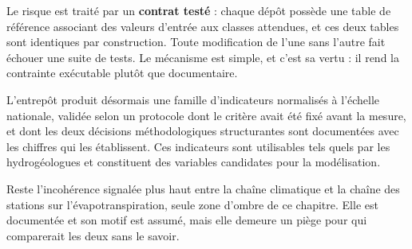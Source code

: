 Le risque est traité par un \textbf{contrat testé} : chaque dépôt possède une table de référence
associant des valeurs d'entrée aux classes attendues, et ces deux tables sont identiques par
construction. Toute modification de l'une sans l'autre fait échouer une suite de tests. Le
mécanisme est simple, et c'est sa vertu : il rend la contrainte exécutable plutôt que
documentaire.

L'entrepôt produit désormais une famille d'indicateurs normalisés à l'échelle nationale, validée
selon un protocole dont le critère avait été fixé avant la mesure, et dont les deux décisions
méthodologiques structurantes sont documentées avec les chiffres qui les établissent. Ces
indicateurs sont utilisables tels quels par les hydrogéologues et constituent des variables
candidates pour la modélisation.

Reste l'incohérence signalée plus haut entre la chaîne climatique et la chaîne des stations sur
l'évapotranspiration, seule zone d'ombre de ce chapitre. Elle est documentée et son motif est
assumé, mais elle demeure un piège pour qui comparerait les deux sans le savoir.
